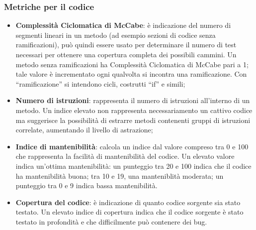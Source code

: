 \subsubsection{Metriche per il codice}
\begin{itemize}
\item \textbf{Complessità Ciclomatica di McCabe}: è indicazione del numero di segmenti lineari in un metodo (ad esempio sezioni di codice senza ramificazioni), può quindi essere usato per determinare il numero di test necessari per ottenere una copertura completa dei possibili cammini. 
Un metodo senza ramificazioni ha Complessità Ciclomatica di McCabe pari a 1; tale valore è incrementato ogni qualvolta si incontra una ramificazione. 
Con “ramificazione” si intendono cicli, costrutti “if” e simili;

\item \textbf{Numero di istruzioni}: rappresenta il numero di istruzioni all'interno di un metodo. 
Un indice elevato non rappresenta necessariamento un cattivo codice ma suggerisce la possibilità di estrarre metodi contenenti gruppi di istruzioni correlate, aumentando il livello di astrazione;

\item \textbf{Indice di mantenibilità}: calcola un indice dal valore compreso tra 0 e 100 che rappresenta la facilità di mantenibilità del codice. 
Un elevato valore indica un'ottima mantenibilità: un punteggio tra 20 e 100 indica che il codice ha mantenibilità buona; tra 10 e 19, una manteniblità moderata; un punteggio tra 0 e 9 indica bassa mantenibilità.

\item \textbf{Copertura del codice}: è indicazione di quanto codice sorgente sia stato testato. Un elevato indice di copertura indica che il codice sorgente è stato testato in profondità e che difficilmente può contenere dei bug.

\end{itemize}
